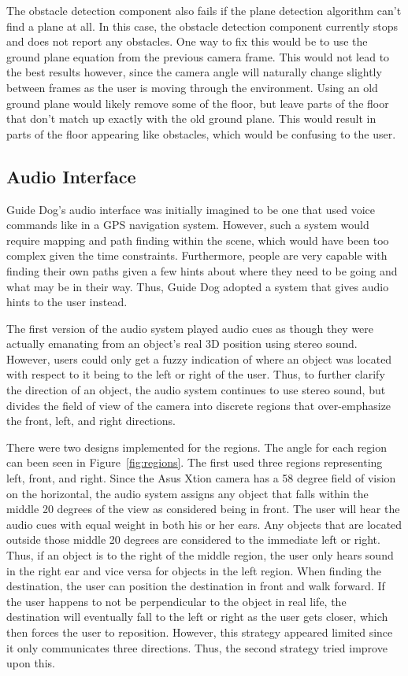 The obstacle detection component also fails if the plane detection algorithm
can't find a plane at all. In this case, the obstacle detection component
currently stops and does not report any obstacles. One way to fix this would be
to use the ground plane equation from the previous camera frame. This would not
lead to the best results however, since the camera angle will naturally change
slightly between frames as the user is moving through the environment. Using an
old ground plane would likely remove some of the floor, but leave parts of the
floor that don't match up exactly with the old ground plane. This would result
in parts of the floor appearing like obstacles, which would be confusing to the
user.


\subsection{Audio Interface}
\label{sec:eval-audio}

Guide Dog's audio interface was initially imagined to be one that used voice
commands like in a GPS navigation system. However, such a system would require
mapping and path finding within the scene, which would have been too complex
given the time constraints. Furthermore, people are very capable with finding
their own paths given a few hints about where they need to be going and what
may be in their way. Thus, Guide Dog adopted a system that gives audio hints to
the user instead.

The first version of the audio system played audio cues as though they were
actually emanating from an object's real 3D position using stereo sound. However,
users could only get a fuzzy indication of where an object was located with
respect to it being to the left or right of the user. Thus, to further clarify
the direction of an object, the audio system continues to use stereo sound, but
divides the field of view of the camera into discrete regions that over-emphasize
the front, left, and right directions.

There were two designs implemented for the regions. The angle for each region
can been seen in Figure~\ref{fig:regions}. The first used three regions
representing left, front, and right. Since the Asus Xtion camera has a 58 degree
field of vision on the horizontal, the audio system assigns any object that
falls within the middle 20 degrees of the view as considered being in front. The
user will hear the audio cues with equal weight in both his or her ears. Any
objects that are located outside those middle 20 degrees are considered to the
immediate left or right. Thus, if an object is to the right of the middle region,
the user only hears sound in the right ear and vice versa for objects in the
left region. When finding the destination, the user can position the destination
in front and walk forward. If the user happens to not be perpendicular to the
object in real life, the destination will eventually fall to the left or right
as the user gets closer, which then forces the user to reposition. However, this
strategy appeared limited since it only communicates three directions. Thus, the
second strategy tried improve upon this.

